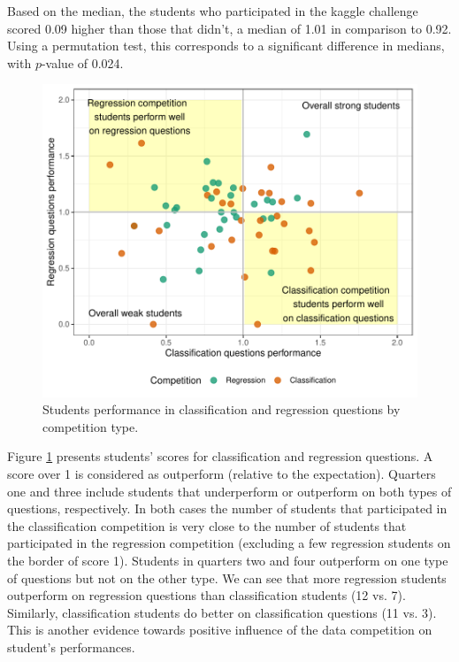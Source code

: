 \documentclass[12pt]{article}
\begin{document}
Based on the median, the students who participated in the kaggle
challenge scored 0.09 higher than those that didn't, a median of 1.01 in
comparison to 0.92. Using a permutation test, this corresponds to a
significant difference in medians, with \(p\)-value of 0.024.

\begin{figure}
\centering
\includegraphics{paper-kaggle_files/figure-latex/crossperformances-1.pdf}
\caption{\label{fig:crossperformances} Students performance in
classification and regression questions by competition type.}
\end{figure}

Figure \ref{fig:crossperformances} presents students' scores for
classification and regression questions. A score over 1 is considered as
outperform (relative to the expectation). Quarters one and three include
students that underperform or outperform on both types of questions,
respectively. In both cases the number of students that participated in
the classification competition is very close to the number of students
that participated in the regression competition (excluding a few
regression students on the border of score 1). Students in quarters two
and four outperform on one type of questions but not on the other type.
We can see that more regression students outperform on regression
questions than classification students (12 vs. 7). Similarly,
classification students do better on classification questions (11 vs.
3). This is another evidence towards positive influence of the data
competition on student's performances.
\end{document}
